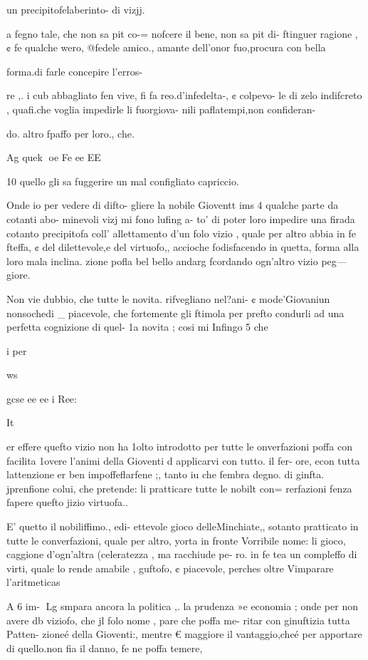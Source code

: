 {{un precipitofelaberinto- di vizjj.

a fegno tale, che non sa pit co-=
nofcere il bene, non sa pit di-
ftinguer ragione , ¢ fe qualche
wero, @fedele amico., amante
dell’onor fuo,procura con bella

forma.di farle concepire l’erros-

re ,. i cub abbagliato fen vive,
fi fa reo.d’infedelta-, ¢ colpevo-
le di zelo indifcreto , quafi.che
voglia impedirle li fuorgiova-
nili paflatempi,non confideran-

do. altro fpaffo per loro., che.

Ag quek
oe Fe ee EE

10
quello gli sa fuggerire un mal
configliato capriccio.

Onde io per vedere di difto-
gliere la nobile Gioventt ims 4
qualche parte da cotanti abo-
minevoli vizj mi fono lufing a-
to’ di poter loro impedire una
firada cotanto precipitofa coll’
allettamento d’un folo vizio ,
quale per altro abbia in fe fteffa,
¢ del dilettevole,e del virtuofo,,
accioche fodisfacendo in quetta,
forma alla loro mala inclina.
zione pofla bel bello andarg
fcordando ogn’altro vizio peg—
giore.

Non vie dubbio, che tutte
le novita. rifvegliano nel?ani- ¢
mode’Giovaniun nonsochedi _
piacevole, che fortemente gli
ftimola per prefto condurli ad
una perfetta cognizione di quel-
1a novita ; cosi mi Infingo 5 che

i per

ws

gcse ee ee i Ree:
 

It

er effere quefto vizio non ha
1olto introdotto per tutte le
onverfazioni poffa con facilita
1overe l’animi della Gioventi
d applicarvi con tutto. il fer-
ore, econ tutta lattenzione
er ben impoffeflarfene ;, tanto
iu che fembra degno. di ginfta.
jprenfione colui, che pretende:
li pratticare tutte le nobilt con=
rerfazioni fenza fapere quefto
jizio virtuofa..

E’ quetto il nobiliffimo., edi-
ettevole gioco delleMinchiate,,
sotanto pratticato in tutte le
converfazioni, quale per altro,
yorta in fronte Vorribile nome:
li gioco, caggione d’ogn’altra
(celeratezza , ma racchiude pe-
ro. in fe tea un compleffo di
virti, quale lo rende amabile ,
guftofo, ¢ piacevole, perches
oltre Vimparare l’aritmeticas

A 6 im-
Lg
smpara ancora la politica ,. la
prudenza »e economia ; onde
per non avere db viziofo, che jl
folo nome , pare che poffa me-
ritar con ginuftizia tutta Patten-
zioneé della Gioventi:, mentre
€ maggiore il vantaggio,cheé
per apportare di quello.non fia
il danno, fe ne poffa temere,

}}
